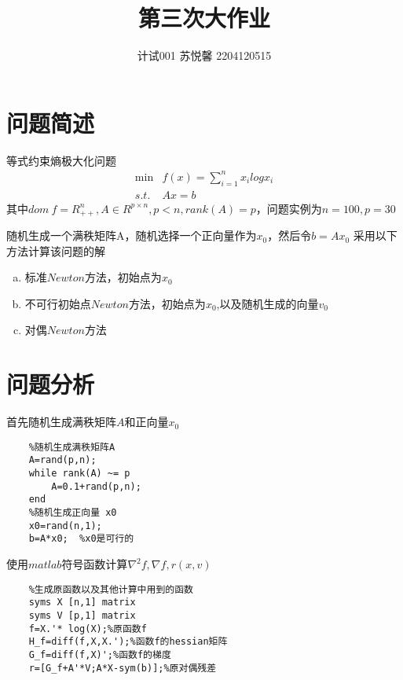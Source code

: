 \documentclass{article}
\title{第三次大作业}
\author{计试001 苏悦馨 2204120515}
\date{}
\begin{document}
\maketitle
\section{问题简述}
等式约束熵极大化问题
\begin{equation*}
    \begin{array}{ll}
        \min & f(x)=\sum\limits_{i=1}^n x_i logx_i \\
        s.t. & Ax=b
    \end{array}
\end{equation*}
其中$dom\ f=R^n_{++},A \in R^{p \times n},p<n ,rank(A)=p$，问题实例为$n=100,p=30$

随机生成一个满秩矩阵A，随机选择一个正向量作为$x_0$，然后令$b=Ax_0$
采用以下方法计算该问题的解
\begin{enumerate}[a)]
    \item 标准$Newton$方法，初始点为$x_0$
    \item 不可行初始点$Newton$方法，初始点为$x_0$,以及随机生成的向量$v_0$
    \item 对偶$Newton$方法
\end{enumerate}

\section{问题分析}
首先随机生成满秩矩阵$A$和正向量$x_0$
\begin{lstlisting}
    %随机生成满秩矩阵A
    A=rand(p,n);
    while rank(A) ~= p
        A=0.1+rand(p,n);
    end
    %随机生成正向量 x0
    x0=rand(n,1);
    b=A*x0;  %x0是可行的
\end{lstlisting}

使用$matlab$符号函数计算$\nabla^2 f, \nabla f, r(x,v)$
\begin{lstlisting}
    %生成原函数以及其他计算中用到的函数
    syms X [n,1] matrix 
    syms V [p,1] matrix
    f=X.'* log(X);%原函数f
    H_f=diff(f,X,X.');%函数f的hessian矩阵
    G_f=diff(f,X)';%函数f的梯度
    r=[G_f+A'*V;A*X-sym(b)];%原对偶残差
\end{lstlisting}
\end{document}
